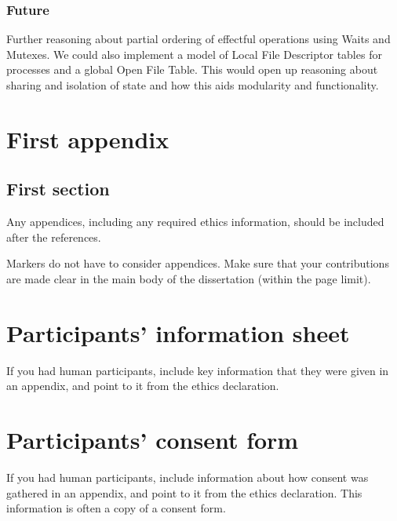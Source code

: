 \documentclass[logo,bsc,singlespacing,parskip]{infthesis}
\begin{document}
\subsection*{Future}
Further reasoning about partial ordering of effectful operations using Waits and Mutexes. We could also implement a model of Local File Descriptor tables for processes and a global Open File Table. This would open up reasoning about sharing and isolation of state and how this aids modularity and functionality.  

% 




\appendix

\chapter{First appendix}

\section{First section}

Any appendices, including any required ethics information, should be included
after the references.

Markers do not have to consider appendices. Make sure that your contributions
are made clear in the main body of the dissertation (within the page limit).

\chapter{Participants' information sheet}

If you had human participants, include key information that they were given in
an appendix, and point to it from the ethics declaration.

\chapter{Participants' consent form}

If you had human participants, include information about how consent was
gathered in an appendix, and point to it from the ethics declaration.
This information is often a copy of a consent form.
\end{document}
